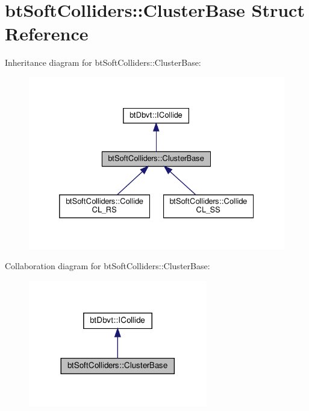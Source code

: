 \hypertarget{structbtSoftColliders_1_1ClusterBase}{}\section{bt\+Soft\+Colliders\+:\+:Cluster\+Base Struct Reference}
\label{structbtSoftColliders_1_1ClusterBase}


Inheritance diagram for bt\+Soft\+Colliders\+:\+:Cluster\+Base\+:
\nopagebreak
\begin{figure}[H]
\begin{center}
\leavevmode
\includegraphics[width=332pt]{structbtSoftColliders_1_1ClusterBase__inherit__graph}
\end{center}
\end{figure}


Collaboration diagram for bt\+Soft\+Colliders\+:\+:Cluster\+Base\+:
\nopagebreak
\begin{figure}[H]
\begin{center}
\leavevmode
\includegraphics[width=221pt]{structbtSoftColliders_1_1ClusterBase__coll__graph}
\end{center}
\end{figure}
